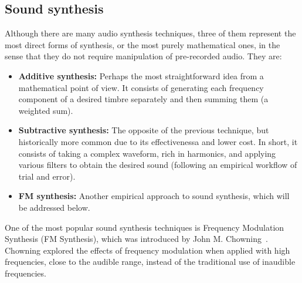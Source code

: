 \documentclass[sigconf,natbib=false]{acmart}
\begin{document}

\subsection{Sound synthesis}
Although there are many audio synthesis techniques, three of them represent the most direct forms of synthesis, or the most purely mathematical ones, in the sense that they do not require manipulation of pre-recorded audio. They are:


\begin{itemize}
    \item \textbf{Additive synthesis:} Perhaps the most straightforward idea from a mathematical point of view. It consists of generating each frequency component of a desired timbre separately and then summing them (a weighted sum).

    \item \textbf{Subtractive synthesis:} The opposite of the previous technique, but historically more common due to its effectivenessa and lower cost. In short, it consists of taking a complex waveform, rich in harmonics, and applying various filters to obtain the desired sound (following an empirical workflow of trial and error).

    \item \textbf{FM synthesis:} Another empirical approach to sound synthesis, which will be addressed below.
\end{itemize}


One of the most popular sound synthesis techniques is Frequency Modulation Synthesis (FM Synthesis), which was introduced by John M. Chowning~\cite{chowning1973synthesis}.%
Chowning explored the effects of frequency modulation when applied with high frequencies, close to the audible range, instead of the traditional use of inaudible frequencies.
\end{document}

